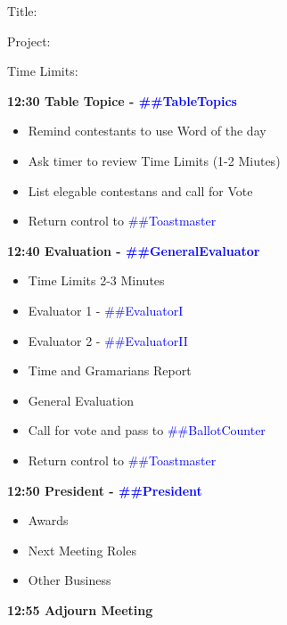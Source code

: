 \documentclass{article}
\newcommand{\toastmaster}{##Toastmaster}
\newcommand{\president}{##President}
\newcommand{\tableTopics}{##TableTopics}
\newcommand{\generalEvaluator}{##GeneralEvaluator}
\newcommand{\evaluatorI}{##EvaluatorI}
\newcommand{\evaluatorII}{##EvaluatorII}
\newcommand{\ballotCounter}{##BallotCounter}
\begin{document}
\begin{spacing}{.8}
\begin{itemize}
\begin{description}
          \item{Title:}
          \item{Project:}
          \item{Time Limits:}
      \end{description}
  \end{itemize}
  {\Large \bf12:30 Table Topice - \textcolor{blue}{\tableTopics{}}} 
  \begin{itemize}
   \item Remind contestants to use Word of the day 
   \item Ask timer to review Time Limits  (1-2 Miutes)
   \item List elegable contestans and call for Vote
   \item Return control to \textcolor{blue}{\toastmaster{}}
  \end{itemize}
  {\Large \bf12:40 Evaluation - \textcolor{blue}{\generalEvaluator{}}} 
  \begin{itemize}
    \item Time Limits 2-3 Minutes
    \item Evaluator 1 - \textcolor{blue}{\evaluatorI{}}
    \item Evaluator 2 - \textcolor{blue}{\evaluatorII{}}
	\item Time and Gramarians Report
	\item General Evaluation
    \item Call for vote and pass to \textcolor{blue}{\ballotCounter{}}
    \item Return control to \textcolor{blue}{\toastmaster{}}
  \end{itemize}
  {\Large \bf12:50 President - \textcolor{blue}{\president{}}} 
  \begin{itemize}
    \item Awards
    \item Next Meeting Roles
    \item Other Business
  \end{itemize}
  {\Large \bf12:55 Adjourn Meeting} 
  \end{spacing}
  
\end{document}
